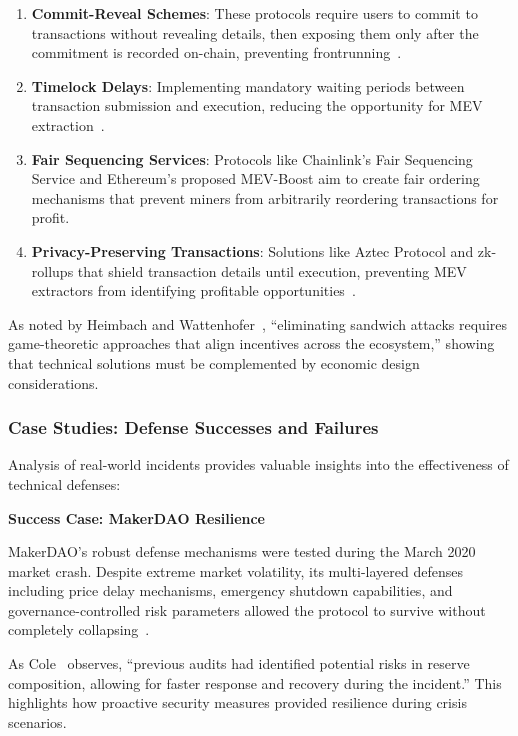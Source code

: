 \documentclass[conference]{IEEEtran}
\begin{document}
    \begin{enumerate}
        \item \textbf{Commit-Reveal Schemes}: These protocols require users to commit to transactions without revealing details, then exposing them only after the commitment is recorded on-chain, preventing frontrunning~\cite{daian2020flash}.
        
        \item \textbf{Timelock Delays}: Implementing mandatory waiting periods between transaction submission and execution, reducing the opportunity for MEV extraction~\cite{qin2022quantifying}.
        
        \item \textbf{Fair Sequencing Services}: Protocols like Chainlink's Fair Sequencing Service and Ethereum's proposed MEV-Boost aim to create fair ordering mechanisms that prevent miners from arbitrarily reordering transactions for profit.
        
        \item \textbf{Privacy-Preserving Transactions}: Solutions like Aztec Protocol and zk-rollups that shield transaction details until execution, preventing MEV extractors from identifying profitable opportunities~\cite{chen2025secure}.
    \end{enumerate}

    As noted by Heimbach and Wattenhofer~\cite{heimbach2022eliminating}, ``eliminating sandwich attacks requires game-theoretic approaches that align incentives across the ecosystem,'' showing that technical solutions must be complemented by economic design considerations.

    \subsubsection{Case Studies: Defense Successes and Failures}
    Analysis of real-world incidents provides valuable insights into the effectiveness of technical defenses:

    \textbf{Success Case: MakerDAO Resilience}

    MakerDAO's robust defense mechanisms were tested during the March 2020 market crash. Despite extreme market volatility, its multi-layered defenses including price delay mechanisms, emergency shutdown capabilities, and governance-controlled risk parameters allowed the protocol to survive without completely collapsing~\cite{xu2021sok}.

    As Cole~\cite{cole2024understanding} observes, ``previous audits had identified potential risks in reserve composition, allowing for faster response and recovery during the incident.'' This highlights how proactive security measures provided resilience during crisis scenarios.
\end{document}
